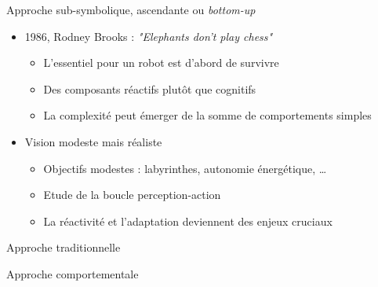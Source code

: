 \documentclass[compress]{beamer}
\begin{document}
\begin{frame}{Approche sub-symbolique, ascendante ou {\it bottom-up}}
\begin{itemize}
\item 1986, Rodney Brooks : {\it "Elephants don't play chess"}
	\begin{itemize}
	\item L'essentiel pour un robot est d'abord de survivre
	\item Des composants réactifs plutôt que cognitifs
	\item La complexité peut émerger de la somme de comportements simples
	\end{itemize}
\item Vision modeste mais réaliste
	\begin{itemize}
	\item Objectifs modestes : labyrinthes, autonomie énergétique, \dots
	\item Etude de la boucle perception-action
	\item La réactivité et l'adaptation deviennent des enjeux cruciaux
	\end{itemize}
\end{itemize}
\end{frame}

\begin{frame}{Approche traditionnelle}
\begin{center}
\end{center}
\end{frame}

\begin{frame}{Approche comportementale}
\begin{center}
\end{center}
\end{frame}
\end{document}
